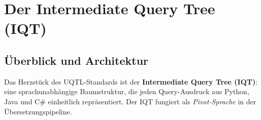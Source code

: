 ﻿%
\section{Der Intermediate Query Tree (IQT)}
\label{sec:iqt}

\subsection{Überblick und Architektur}
\label{subsec:iqt_uebersicht}

Das Herzstück des UQTL-Standards ist der \textbf{Intermediate Query Tree
(IQT)}: eine sprachunabhängige Baumstruktur, die jeden Query-Ausdruck aus
Python, Java und C\# einheitlich repräsentiert. Der IQT fungiert als
\emph{Pivot-Sprache} in der Übersetzungspipeline.

